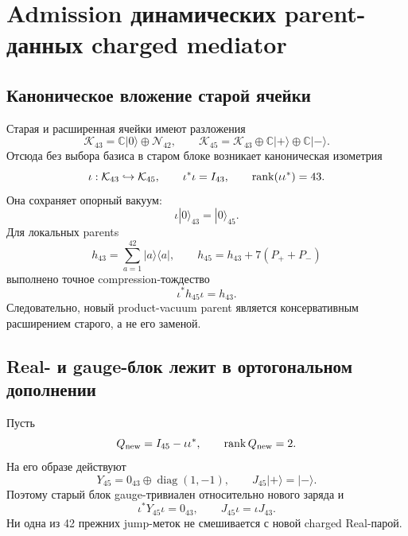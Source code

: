 \chapter{Admission динамических parent-данных charged mediator}
\label{ch:v8-charged-mediator-dynamic-data-admission}

\section{Каноническое вложение старой ячейки}

Старая и расширенная ячейки имеют разложения
\begin{equation}
 \mathcal K_{43}=\mathbb C|0\rangle\oplus\mathcal N_{42},
 \qquad
 \mathcal K_{45}=\mathcal K_{43}\oplus
 \mathbb C|+\rangle\oplus\mathbb C|-\rangle.
 \label{eq:v8-mediator-admission-cell-splitting}
\end{equation}
Отсюда без выбора базиса в старом блоке возникает каноническая изометрия
\begin{equation}
 \iota:\mathcal K_{43}\hookrightarrow\mathcal K_{45},
 \qquad \iota^*\iota=I_{43},
 \qquad \operatorname{rank}(\iota\iota^*)=43.
 \label{eq:v8-mediator-admission-isometry}
\end{equation}
Она сохраняет опорный вакуум:
\begin{equation}
 \iota|0\rangle_{43}=|0\rangle_{45}.
 \label{eq:v8-mediator-admission-vacuum}
\end{equation}
Для локальных parents
\begin{equation}
 h_{43}=\sum_{a=1}^{42}|a\rangle\langle a|,
 \qquad
 h_{45}=h_{43}+7(P_++P_-)
 \label{eq:v8-mediator-admission-local-parents}
\end{equation}
выполнено точное compression-тождество
\begin{equation}
 \iota^*h_{45}\iota=h_{43}.
 \label{eq:v8-mediator-admission-parent-compression}
\end{equation}
Следовательно, новый product-vacuum parent является консервативным
расширением старого, а не его заменой.

\section{Real- и gauge-блок лежит в ортогональном дополнении}

Пусть
\begin{equation}
 Q_{\rm new}=I_{45}-\iota\iota^*,
 \qquad \operatorname{rank} Q_{\rm new}=2.
 \label{eq:v8-mediator-admission-new-projector}
\end{equation}
На его образе действуют
\begin{equation}
 Y_{45}=0_{43}\oplus\operatorname{diag}(1,-1),
 \qquad J_{45}|+\rangle=|-\rangle.
 \label{eq:v8-mediator-admission-charge-real}
\end{equation}
Поэтому старый блок gauge-тривиален относительно нового заряда и
\begin{equation}
 \iota^*Y_{45}\iota=0_{43},
 \qquad J_{45}\iota=\iota J_{43}.
 \label{eq:v8-mediator-admission-symmetry-compression}
\end{equation}
Ни одна из 42 прежних jump-меток не смешивается с новой charged Real-парой.

